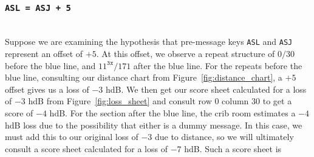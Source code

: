 \subsubsection{\texttt{ASL = ASJ + 5}}
\text{}\\Suppose we are examining the hypothesis that pre-message
keys \texttt{ASL} and \texttt{ASJ} represent an offset of $+5$. At
this offset, we observe a repeat structure of $0/30$ before the
blue line, and $11^\texttt{3x}/171$ after the blue line. For the
repeats before the blue line, consulting our distance chart from
Figure~\ref{fig:distance_chart}, a $+5$ offset gives us a loss of
$-3$ hdB. We then get our score sheet calculated for a loss of $-3$
hdB from Figure~\ref{fig:loss_sheet} and consult row $0$ column
$30$ to get a score of $-4$ hdB. For the section after the blue
line, the crib room estimates a $-4$ hdB loss due to the
possibility that either is a dummy message. In this case, we must
add this to our original loss of $-3$ due to distance, so we will
ultimately consult a score sheet calculated for a loss of $-7$ hdB.
Such a score sheet is

